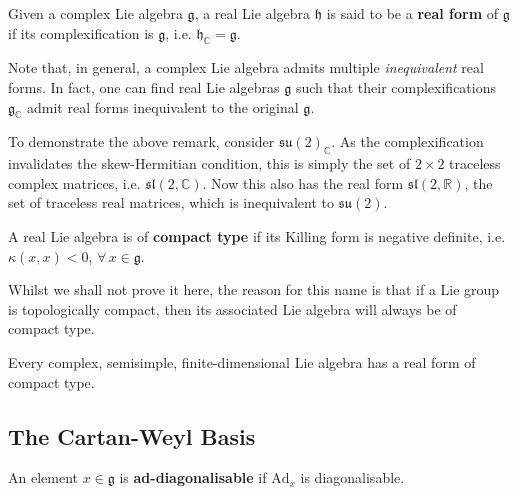 \documentclass[11pt,fleqn]{article}
\begin{document}
\begin{definition}
	Given a complex Lie algebra $\mathfrak{g}$, a real Lie algebra $\mathfrak{h}$ is said to be a \textbf{real form} of $\mathfrak{g}$ if its complexification is $\mathfrak{g}$, i.e. $\mathfrak{h}_\mathbb{C} = \mathfrak{g}$.
\end{definition}
\begin{remark}
	Note that, in general, a complex Lie algebra admits multiple \textit{inequivalent} real forms. In fact, one can find real Lie algebras $\mathfrak{g}$ such that their complexifications $\mathfrak{g}_\mathbb{C}$ admit real forms inequivalent to the original $\mathfrak{g}$.
\end{remark}
\begin{example}
	To demonstrate the above remark, consider $\mathfrak{su}(2)_\mathbb{C}$. As the complexification invalidates the skew-Hermitian condition, this is simply the set of $2 \times 2$ traceless complex matrices, i.e. $\mathfrak{sl}(2,\mathbb{C})$. Now this also has the real form $\mathfrak{sl}(2,\mathbb{R})$, the set of traceless real matrices, which is inequivalent to $\mathfrak{su}(2)$.
\end{example}

\begin{definition}
	A real Lie algebra is of \textbf{compact type} if its Killing form is negative definite, i.e. $\kappa(x,x) < 0$, $\forall \, x \in \mathfrak{g}$.
\end{definition}
\begin{remark}
	Whilst we shall not prove it here, the reason for this name is that if a Lie group is topologically compact, then its associated Lie algebra will always be of compact type.
\end{remark}

\begin{theorem}
	Every complex, semisimple, finite-dimensional Lie algebra has a real form of compact type.
\end{theorem}

\subsection{The Cartan-Weyl Basis}

\begin{definition}[Ad-diagonalisable]
	An element $x \in \mathfrak{g}$ is \textbf{ad-diagonalisable} if $\text{Ad}_x$ is diagonalisable.
\end{definition}
\end{document}
